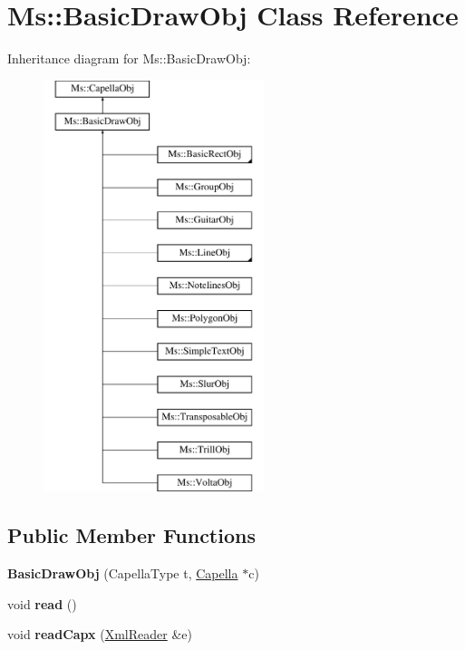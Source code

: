 \hypertarget{class_ms_1_1_basic_draw_obj}{}\section{Ms\+:\+:Basic\+Draw\+Obj Class Reference}
\label{class_ms_1_1_basic_draw_obj}
Inheritance diagram for Ms\+:\+:Basic\+Draw\+Obj\+:\begin{figure}[H]
\begin{center}
\leavevmode
\includegraphics[height=12.000000cm]{class_ms_1_1_basic_draw_obj}
\end{center}
\end{figure}
\subsection*{Public Member Functions}
\begin{DoxyCompactItemize}
\item 
\mbox{\label{class_ms_1_1_basic_draw_obj_abca2071528f9562e1976b74978a552c2}} 
{\bfseries Basic\+Draw\+Obj} (Capella\+Type t, \hyperlink{class_ms_1_1_capella}{Capella} $\ast$c)
\item 
\mbox{\label{class_ms_1_1_basic_draw_obj_ac523ffed4a0802b3583cead7598e84bc}} 
void {\bfseries read} ()
\item 
\mbox{\label{class_ms_1_1_basic_draw_obj_a62645a32e798f6e18879d23fca3b2ff4}} 
void {\bfseries read\+Capx} (\hyperlink{class_ms_1_1_xml_reader}{Xml\+Reader} \&e)
\end{DoxyCompactItemize}
